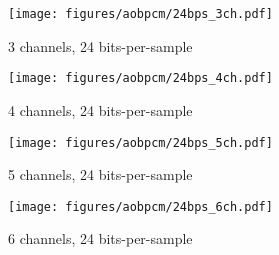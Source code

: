 \clearpage

\begin{figure}[h!]
\texttt{[image: figures/aobpcm/24bps\_3ch.pdf]}
\caption{3 channels, 24 bits-per-sample}
\end{figure}

\begin{figure}[h!]
\texttt{[image: figures/aobpcm/24bps\_4ch.pdf]}
\caption{4 channels, 24 bits-per-sample}
\end{figure}

\clearpage

\begin{figure}[h!]
\texttt{[image: figures/aobpcm/24bps\_5ch.pdf]}
\caption{5 channels, 24 bits-per-sample}
\end{figure}

\begin{figure}[h!]
\texttt{[image: figures/aobpcm/24bps\_6ch.pdf]}
\caption{6 channels, 24 bits-per-sample}
\end{figure}


\clearpage
\label{aob_mlp}

